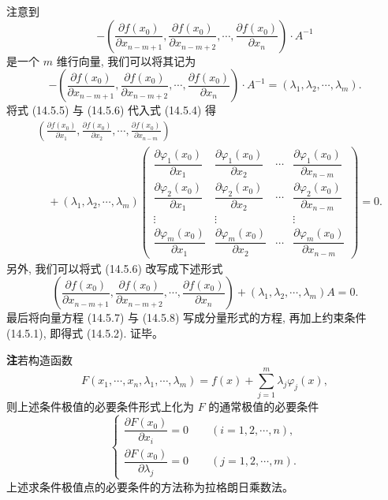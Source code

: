 \documentclass[UTF8, 12pt, fontset=fandol, oneside]{ctexart}
\begin{document}
注意到
\[
  -
  \left(
    \frac{\partial f(x_0)}{\partial x_{n-m+1}},
    \frac{\partial f(x_0)}{\partial x_{n-m+2}},
    \cdots,
    \frac{\partial f(x_0)}{\partial x_n}
  \right)\cdot A^{-1}
\]
是一个 $m$ 维行向量, 我们可以将其记为
\begin{equation}
  -
  \left(
    \frac{\partial f(x_0)}{\partial x_{n-m+1}},
    \frac{\partial f(x_0)}{\partial x_{n-m+2}},
    \cdots,
    \frac{\partial f(x_0)}{\partial x_n}
  \right)\cdot A^{-1}
  =(\lambda_1,\lambda_2,\cdots,\lambda_m).
  \tag{14.5.6}
\end{equation}
将式 (14.5.5) 与 (14.5.6) 代入式 (14.5.4) 得
\begin{equation}
\begin{aligned}
  &\left(
    \frac{\partial f(x_0)}{\partial x_1},
    \frac{\partial f(x_0)}{\partial x_2},
    \cdots,
    \frac{\partial f(x_0)}{\partial x_{n-m}}
  \right)\\
  &\quad+
  (\lambda_1,\lambda_2,\cdots,\lambda_m)
  \begin{pmatrix}
    \dfrac{\partial\varphi_1(x_0)}{\partial x_1} &
    \dfrac{\partial\varphi_1(x_0)}{\partial x_2} &
    \cdots &
    \dfrac{\partial\varphi_1(x_0)}{\partial x_{n-m}}\\
    \dfrac{\partial\varphi_2(x_0)}{\partial x_1} &
    \dfrac{\partial\varphi_2(x_0)}{\partial x_2} &
    \cdots &
    \dfrac{\partial\varphi_2(x_0)}{\partial x_{n-m}}\\
    \vdots & \vdots & & \vdots\\
    \dfrac{\partial\varphi_m(x_0)}{\partial x_1} &
    \dfrac{\partial\varphi_m(x_0)}{\partial x_2} &
    \cdots &
    \dfrac{\partial\varphi_m(x_0)}{\partial x_{n-m}}
  \end{pmatrix}
  =0.
\end{aligned}
\tag{14.5.7}
\end{equation}
另外, 我们可以将式 (14.5.6) 改写成下述形式
\begin{equation}
  \left(
    \frac{\partial f(x_0)}{\partial x_{n-m+1}},
    \frac{\partial f(x_0)}{\partial x_{n-m+2}},
    \cdots,
    \frac{\partial f(x_0)}{\partial x_n}
  \right)
  +
  (\lambda_1,\lambda_2,\cdots,\lambda_m)
  A=0.
  \tag{14.5.8}
\end{equation}
最后将向量方程 (14.5.7) 与 (14.5.8) 写成分量形式的方程, 再加上约束条件 (14.5.1), 即得式 (14.5.2). 证毕。

\noindent\textbf{注}\quad 若构造函数
\[
  F(x_1,\cdots,x_n,\lambda_1,\cdots,\lambda_m)
  =
  f(x)+\sum_{j=1}^m\lambda_j\varphi_j(x),
\]
则上述条件极值的必要条件形式上化为 $F$ 的通常极值的必要条件
\begin{equation}
  \begin{cases}
    \dfrac{\partial F(x_0)}{\partial x_i}=0
    \qquad (i=1,2,\cdots,n),\\[1.2ex]
    \dfrac{\partial F(x_0)}{\partial\lambda_j}=0
    \qquad (j=1,2,\cdots,m).
  \end{cases}
  \tag{14.5.9}
\end{equation}
上述求条件极值点的必要条件的方法称为拉格朗日乘数法。
\end{document}
